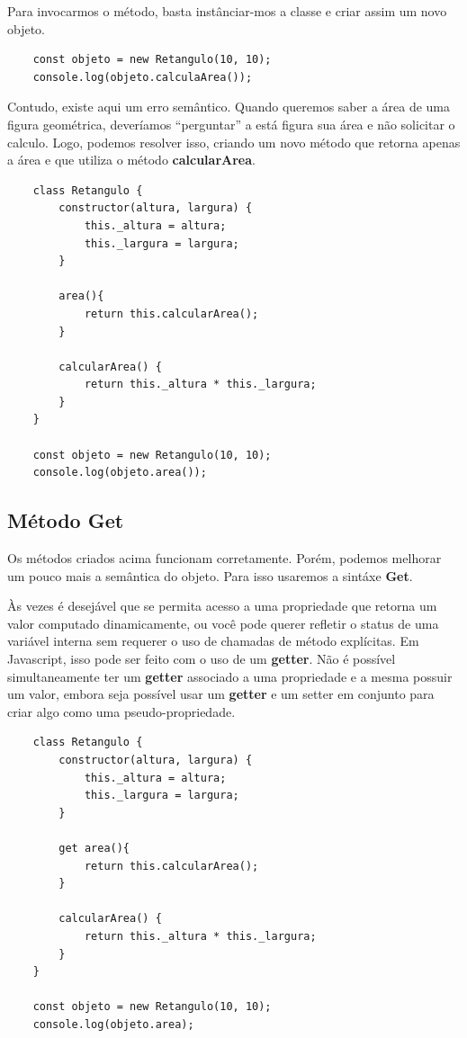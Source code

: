 Para invocarmos o método, basta instânciar-mos a classe e criar assim um novo objeto.

\begin{verbatim}
	const objeto = new Retangulo(10, 10);
	console.log(objeto.calculaArea());
\end{verbatim}

Contudo, existe aqui um erro semântico. Quando queremos saber a área de uma figura geométrica, deveríamos ``perguntar'' a está figura sua área e não solicitar o calculo. Logo, podemos resolver isso, criando um novo método que retorna apenas a área e que utiliza o método \textbf{calcularArea}. 

\begin{verbatim}
	class Retangulo {
		constructor(altura, largura) {
			this._altura = altura;
			this._largura = largura;
		}
	
		area(){
			return this.calcularArea();
		}
		
		calcularArea() {
			return this._altura * this._largura;
		}
	}

	const objeto = new Retangulo(10, 10);
	console.log(objeto.area());
\end{verbatim}

\subsection{Método Get}

Os métodos criados acima funcionam corretamente. Porém, podemos melhorar um pouco mais a semântica do objeto. Para isso usaremos a sintáxe \textbf{Get}.

Às vezes é desejável que se permita acesso a uma propriedade que retorna um valor computado dinamicamente, ou você pode querer refletir o status de uma variável interna sem requerer o uso de chamadas de método explícitas. Em Javascript, isso pode ser feito com o uso de um \textbf{getter}. Não é possível simultaneamente ter um \textbf{getter} associado a uma propriedade e a mesma possuir um valor, embora seja possível usar um \textbf{getter} e um setter em conjunto para criar algo como uma pseudo-propriedade.

\begin{verbatim}
	class Retangulo {
		constructor(altura, largura) {
			this._altura = altura;
			this._largura = largura;
		}
		
		get area(){
			return this.calcularArea();
		}
		
		calcularArea() {
			return this._altura * this._largura;
		}
	}
	
	const objeto = new Retangulo(10, 10);
	console.log(objeto.area);
\end{verbatim}

